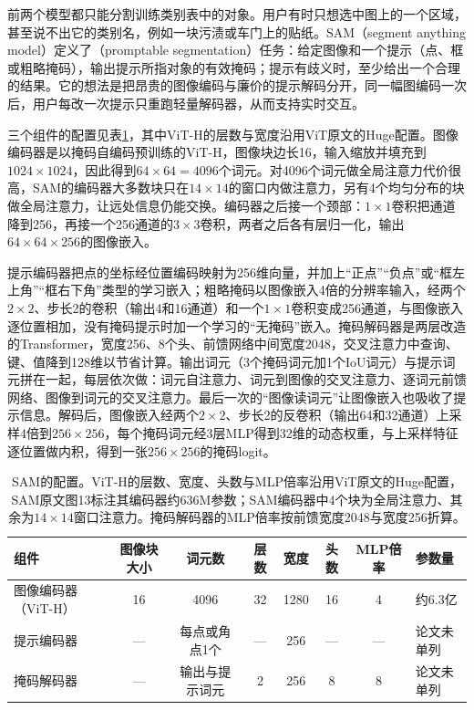 前两个模型都只能分割训练类别表中的对象。用户有时只想选中图上的一个区域，甚至说不出它的类别名，例如一块污渍或车门上的贴纸。SAM（segment anything model）定义了（promptable segmentation）任务：给定图像和一个提示（点、框或粗略掩码），输出提示所指对象的有效掩码；提示有歧义时，至少给出一个合理的结果。它的想法是把昂贵的图像编码与廉价的提示解码分开，同一幅图编码一次后，用户每改一次提示只重跑轻量解码器，从而支持实时交互。

三个组件的配置见表\ref{tab:vision-recognition-sam-config}，其中ViT-H的层数与宽度沿用ViT原文的Huge配置。图像编码器是以掩码自编码预训练的ViT-H，图像块边长16，输入缩放并填充到$1024\times1024$，因此得到$64\times64=4096$个词元。对4096个词元做全局注意力代价很高，SAM的编码器大多数块只在$14\times14$的窗口内做注意力，另有4个均匀分布的块做全局注意力，让远处信息仍能交换。编码器之后接一个颈部：$1\times1$卷积把通道降到256，再接一个256通道的$3\times3$卷积，两者之后各有层归一化，输出$64\times64\times256$的图像嵌入。

提示编码器把点的坐标经位置编码映射为256维向量，并加上“正点”“负点”或“框左上角”“框右下角”类型的学习嵌入；粗略掩码以图像嵌入4倍的分辨率输入，经两个$2\times2$、步长2的卷积（输出4和16通道）和一个$1\times1$卷积变成256通道，与图像嵌入逐位置相加，没有掩码提示时加一个学习的“无掩码”嵌入。掩码解码器是两层改造的Transformer，宽度256、8个头、前馈网络中间宽度2048，交叉注意力中查询、键、值降到128维以节省计算。输出词元（3个掩码词元加1个IoU词元）与提示词元拼在一起，每层依次做：词元自注意力、词元到图像的交叉注意力、逐词元前馈网络、图像到词元的交叉注意力。最后一次的“图像读词元”让图像嵌入也吸收了提示信息。解码后，图像嵌入经两个$2\times2$、步长2的反卷积（输出64和32通道）上采样4倍到$256\times256$，每个掩码词元经3层MLP得到32维的动态权重，与上采样特征逐位置做内积，得到一张$256\times256$的掩码logit。

\begin{table}[tbp]
 \centering
 \small
 \begin{tabular}{@{}lccccccl@{}}
 \toprule
 组件 & 图像块大小 & 词元数 & 层数 & 宽度 & 头数 & MLP倍率 & 参数量\\
 \midrule
 图像编码器（ViT-H） & 16 & 4096 & 32 & 1280 & 16 & 4 & 约6.3亿\\
 提示编码器 & — & 每点或角点1个 & — & 256 & — & — & 论文未单列\\
 掩码解码器 & — & 输出与提示词元 & 2 & 256 & 8 & 8 & 论文未单列\\
 \bottomrule
 \end{tabular}
 \caption{SAM的配置。ViT-H的层数、宽度、头数与MLP倍率沿用ViT原文的Huge配置，SAM原文图13标注其编码器约636M参数；SAM编码器中4个块为全局注意力、其余为$14\times14$窗口注意力。掩码解码器的MLP倍率按前馈宽度2048与宽度256折算。}
 \label{tab:vision-recognition-sam-config}
\end{table}

